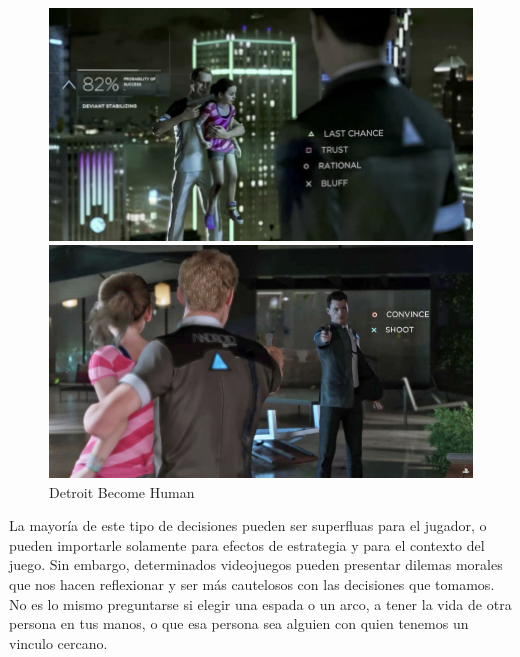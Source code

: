 \begin{figure}[ht]
    \centering
    \begin{minipage}{.45\textwidth}
        \includegraphics[width=\textwidth]{imgs/detroit-choices.jpg}
    \end{minipage}
    \begin{minipage}{.45\textwidth}
        \includegraphics[width=\textwidth]{imgs/detroit-shoot.jpg}
    \end{minipage}
    
    \caption{Detroit Become Human}
    \label{multifig:detroit}
\end{figure}

La mayoría de este tipo de decisiones pueden ser superfluas para el jugador, o pueden importarle solamente para efectos de estrategia y para el contexto del juego. Sin embargo, determinados videojuegos pueden presentar dilemas morales que nos hacen reflexionar y ser más cautelosos con las decisiones que tomamos. No es lo mismo preguntarse si elegir una espada o un arco, a tener la vida de otra persona en tus manos, o que esa persona sea alguien con quien tenemos un vinculo cercano.

